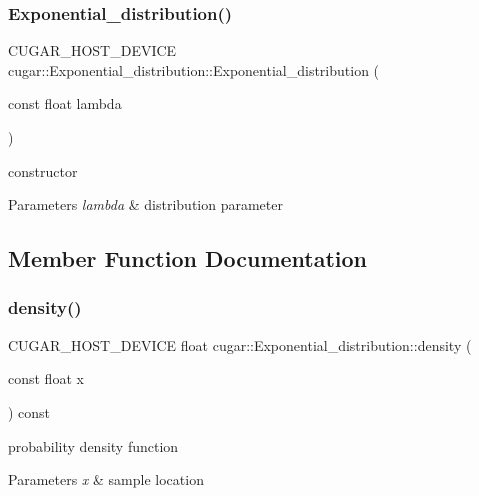 \subsubsection{\texorpdfstring{Exponential\+\_\+distribution()}{Exponential\_distribution()}}
{\footnotesize\ttfamily C\+U\+G\+A\+R\+\_\+\+H\+O\+S\+T\+\_\+\+D\+E\+V\+I\+CE cugar\+::\+Exponential\+\_\+distribution\+::\+Exponential\+\_\+distribution (\begin{DoxyParamCaption}\item[{const float}]{lambda }\end{DoxyParamCaption})\hspace{0.3cm}{\ttfamily [inline]}}

constructor


\begin{DoxyParams}{Parameters}
{\em lambda} & distribution parameter \\
\hline
\end{DoxyParams}


\subsection{Member Function Documentation}
\mbox{\label{structcugar_1_1_exponential__distribution_a23a3999512db509214ac2e6a0ee2c4ef}} 
\subsubsection{\texorpdfstring{density()}{density()}}
{\footnotesize\ttfamily C\+U\+G\+A\+R\+\_\+\+H\+O\+S\+T\+\_\+\+D\+E\+V\+I\+CE float cugar\+::\+Exponential\+\_\+distribution\+::density (\begin{DoxyParamCaption}\item[{const float}]{x }\end{DoxyParamCaption}) const\hspace{0.3cm}{\ttfamily [inline]}}

probability density function


\begin{DoxyParams}{Parameters}
{\em x} & sample location \\
\hline
\end{DoxyParams}
\mbox{\label{structcugar_1_1_exponential__distribution_a3af4566629aa9d4d4488b3795a53c4ee}} 
